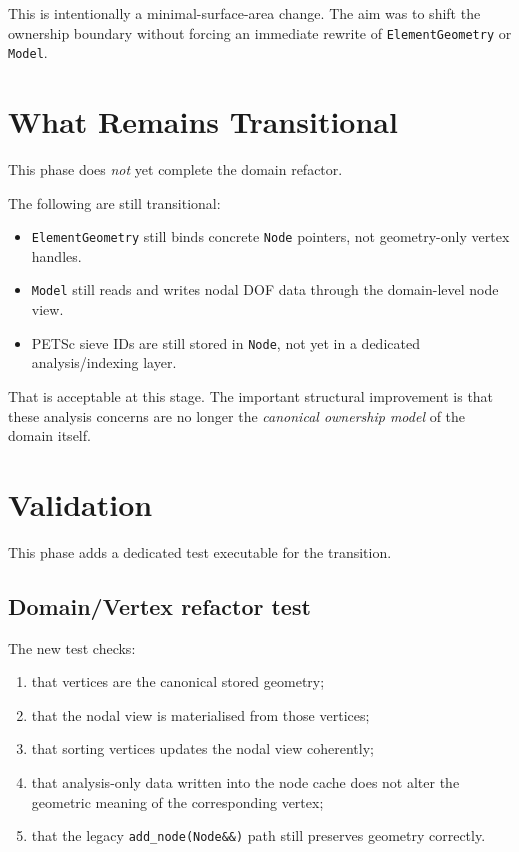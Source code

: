 This is intentionally a minimal-surface-area change.  The aim was to shift the
ownership boundary without forcing an immediate rewrite of
\texttt{ElementGeometry} or \texttt{Model}.


\section{What Remains Transitional}
\label{sec:domain-vertex-transition-transitional}

This phase does \emph{not} yet complete the domain refactor.

The following are still transitional:

\begin{itemize}[nosep]
  \item \texttt{ElementGeometry} still binds concrete \texttt{Node} pointers,
        not geometry-only vertex handles.
  \item \texttt{Model} still reads and writes nodal DOF data through the
        domain-level node view.
  \item PETSc sieve IDs are still stored in \texttt{Node}, not yet in a
        dedicated analysis/indexing layer.
\end{itemize}

That is acceptable at this stage.  The important structural improvement is that
these analysis concerns are no longer the \emph{canonical ownership model} of
the domain itself.


\section{Validation}
\label{sec:domain-vertex-transition-validation}

This phase adds a dedicated test executable for the transition.

\subsection{Domain/Vertex refactor test}

The new test checks:

\begin{enumerate}[nosep]
  \item that vertices are the canonical stored geometry;
  \item that the nodal view is materialised from those vertices;
  \item that sorting vertices updates the nodal view coherently;
  \item that analysis-only data written into the node cache does not alter the
        geometric meaning of the corresponding vertex;
  \item that the legacy \texttt{add\_node(Node\&\&)} path still preserves
        geometry correctly.
\end{enumerate}

